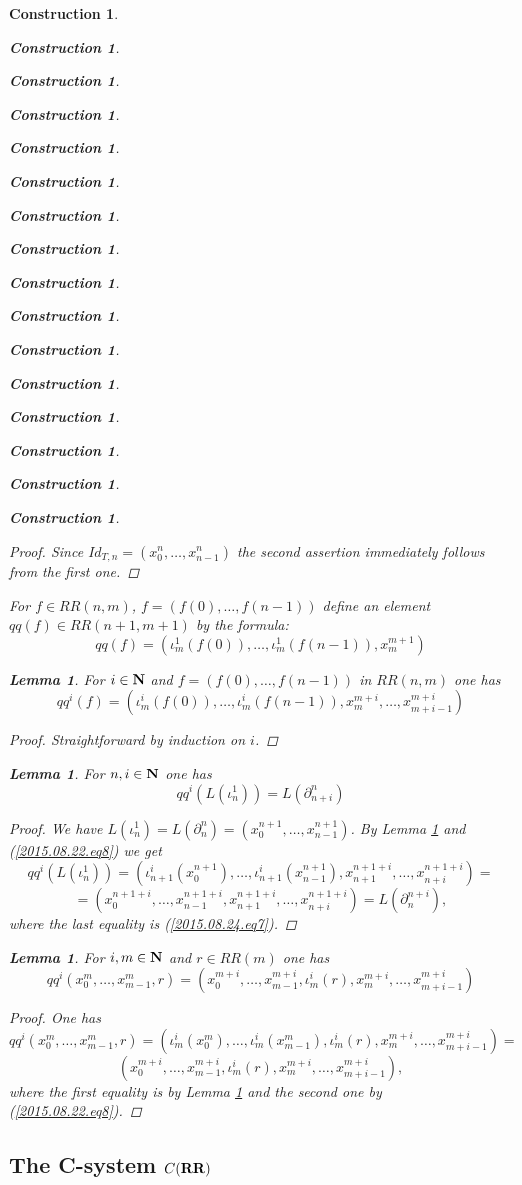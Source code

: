 \documentclass[12pt]{amsart}
\newenvironment{eq}{\begin{equation}}{\end{equation}}
\newtheorem{lemma}[proposition]{Lemma}
\newtheorem{construction}[proposition]{Construction}
\newcommand{\llabel}[1]{\label{#1}}
\newcommand{\nn}{{\bf N\rm}}
\newcommand{\nat}{\nn}
\newcommand{\RR}{{\bf RR}}
\begin{document}
\begin{construction}
\begin{construction}
\begin{construction}
\begin{construction}
\begin{construction}
\begin{construction}
\begin{construction}
\begin{construction}
\begin{construction}
\begin{construction}
\begin{construction}
\begin{construction}
\begin{construction}
\begin{construction}
\begin{construction}
\begin{construction}
\begin{proof}
Since $Id_{T,n}=(x_0^n,\dots,x_{n-1}^n)$ the second assertion immediately follows from the first one.
\end{proof}
%
For $f\in RR(n,m)$, $f=(f(0),\dots,f(n-1))$ define an element $qq(f)\in RR(n+1,m+1)$ by the formula: 
%
\begin{eq}\llabel{2015.08.26.eq9}
qq(f)=(\iota_m^1(f(0)),\dots,\iota_m^1(f(n-1)),x_m^{m+1})
\end{eq}%
%
\begin{lemma}
\llabel{2015.08.26.l2}
For $i\in\nat$ and $f=(f(0),\dots,f(n-1))$ in $RR(n,m)$ one has
%
$$qq^i(f)=(\iota_m^i(f(0)),\dots,\iota_m^i(f(n-1)),x_m^{m+i},\dots,x_{m+i-1}^{m+i})$$
%
\end{lemma}
%
\begin{proof}
Straightforward by induction on $i$.
\end{proof}
%
\begin{lemma}
\llabel{2015.08.26.l3a}
For $n,i\in\nat$ one has
%
$$qq^i(L(\iota_n^1))=L(\partial^n_{n+i})$$
%
\end{lemma}
%
\begin{proof}
We have ${L}(\iota_n^1)=L(\partial_n^n)=(x_0^{n+1},\dots,x^{n+1}_{n-1})$. By
Lemma \ref{2015.08.26.l2} and (\ref{2015.08.22.eq8}) we get
%
$$qq^i({L}(\iota_n^1))=(\iota_{n+1}^i(x_0^{n+1}),\dots,\iota_{n+1}^i(x_{n-1}^{n+1}),x_{n+1}^{n+1+i},\dots,x_{n+i}^{n+1+i})=$$
$$=(x_0^{n+1+i},\dots,x_{n-1}^{n+1+i},x_{n+1}^{n+1+i},\dots,x_{n+i}^{n+1+i})={L}(\partial_n^{n+i}),$$
%
where the last equality is (\ref{2015.08.24.eq7}). 
\end{proof}
%
\begin{lemma}
\llabel{2015.08.28.l1}
For $i,m\in\nat$ and $r\in RR(m)$ one has
%
$$qq^i(x_0^m,\dots,x^m_{m-1},r)=(x_0^{m+i},\dots,x^{m+i}_{m-1},\iota_m^i(r),x_m^{m+i},\dots,x_{m+i-1}^{m+i})$$
%
\end{lemma}
%
\begin{proof}
One has
%
$$qq^i(x_0^m,\dots,x^m_{m-1},r)=(\iota_m^i(x_0^m),\dots,\iota_m^i(x^m_{m-1}),\iota_m^i(r),x_m^{m+i},\dots,x_{m+i-1}^{m+i})=$$
$$(x_0^{m+i},\dots,x^{m+i}_{m-1},\iota_m^i(r),x_m^{m+i},\dots,x_{m+i-1}^{m+i}),$$
%
where the first equality is by Lemma \ref{2015.08.26.l2} and the second one by
(\ref{2015.08.22.eq8}).
\end{proof}
%

\subsection{The C-system $C(\RR)$}
%
\llabel{CRR}


\end{construction}
\end{construction}
\end{construction}
\end{construction}
\end{construction}
\end{construction}
\end{construction}
\end{construction}
\end{construction}
\end{construction}
\end{construction}
\end{construction}
\end{construction}
\end{construction}
\end{construction}
\end{construction}
\end{document}
